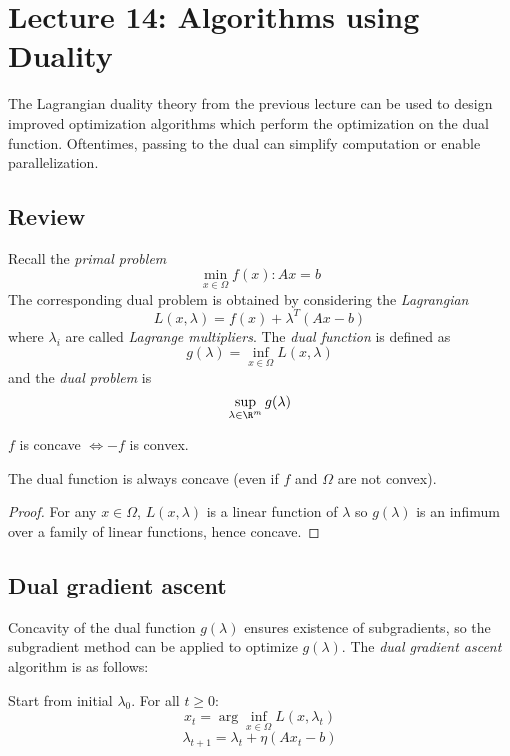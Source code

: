 \section{Lecture 14: Algorithms using Duality}

The Lagrangian duality theory from the previous lecture can be used to
design improved optimization algorithms which perform the optimization
on the dual function. Oftentimes, passing to the dual can simplify
computation or enable parallelization.

\subsection{Review}

Recall the \emph{primal problem}
\[
\min_{x \in \Omega} f(x) : A x = b
\]
The corresponding dual problem is obtained by considering the
\emph{Lagrangian}
\[
L(x,\lambda) = f(x) + \lambda^T(A x  - b)
\]
where $\lambda_i$ are called \emph{Lagrange multipliers}. The
\emph{dual function} is defined as
\[
g(\lambda) = \inf_{x \in \Omega} L(x,\lambda)
\]
and the \emph{dual problem} is
\[
\sup_{\lambda \in \R^m} g(\lambda)
\]

\begin{definition}
$f$ is concave $\iff -f$ is convex.
\end{definition}

\begin{fact}
The dual function is always concave (even if $f$ and
$\Omega$ are not convex).
\end{fact}

\begin{proof}
For any $x \in \Omega$,
$L(x,\lambda)$ is a linear function of $\lambda$ so $g(\lambda)$
is an infimum over a family of linear functions, hence concave.
\end{proof}

\subsection{Dual gradient ascent}

Concavity of the dual function $g(\lambda)$ ensures existence of
subgradients, so the subgradient method can be applied to optimize $g(\lambda)$.
The \emph{dual gradient ascent} algorithm is as follows:

Start from initial $\lambda_0$.
For all $t \geq 0$:
\[
x_t = \arg\inf_{x \in \Omega} L(x, \lambda_t)
\]
\[
\lambda_{t+1} = \lambda_t + \eta (A x_t - b)
\]

